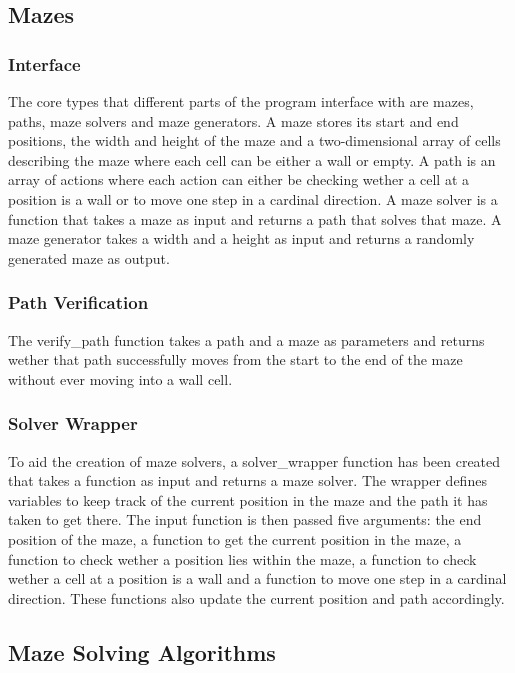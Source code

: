 \subsection{Mazes}

\subsubsection{Interface}

The core types that different parts of the program interface with are mazes, paths, maze solvers and maze generators. A maze stores its start and end positions, the width and height of the maze and a two-dimensional array of cells describing the maze where each cell can be either a wall or empty. A path is an array of actions where each action can either be checking wether a cell at a position is a wall or to move one step in a cardinal direction. A maze solver is a function that takes a maze as input and returns a path that solves that maze. A maze generator takes a width and a height as input and returns a randomly generated maze as output.

\subsubsection{Path Verification}

The verify\_path function takes a path and a maze as parameters and returns wether that path successfully moves from the start to the end of the maze without ever moving into a wall cell.

\subsubsection{Solver Wrapper}

To aid the creation of maze solvers, a solver\_wrapper function has been created that takes a function as input and returns a maze solver. The wrapper defines variables to keep track of the current position in the maze and the path it has taken to get there. The input function is then passed five arguments: the end position of the maze, a function to get the current position in the maze, a function to check wether a position lies within the maze, a function to check wether a cell at a position is a wall and a function to move one step in a cardinal direction. These functions also update the current position and path accordingly.

\subsection{Maze Solving Algorithms}

